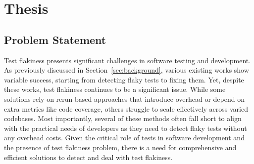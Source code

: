\newpage
\section{Thesis}
\label{sec:thesis}



 




\subsection{Problem Statement}

Test flakiness presents significant challenges in software testing and development. As previously discussed in Section~\ref{sec:background}, various existing works show variable success, starting from detecting flaky tests to fixing them.
Yet, despite these works, test flakiness continues to be a significant issue. While some solutions rely on rerun-based approaches that introduce overhead or depend on extra metrics like code coverage, others struggle to scale effectively across varied codebases. Most importantly, several of these methods often fall short to align with the practical needs of developers as they need to detect flaky tests without any overhead costs. Given the critical role of tests in software development and the presence of test flakiness problem, there is a need for comprehensive and efficient solutions to detect and deal with test flakiness.



